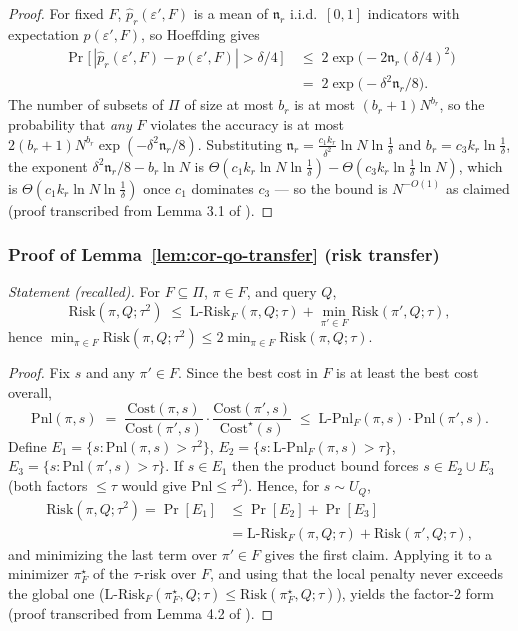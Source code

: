 \begin{proof}
For fixed $F$, $\hat{p}_r(\varepsilon',F)$ is a mean of
$\mathfrak{n}_r$ i.i.d.\ $[0,1]$ indicators with expectation
$p(\varepsilon',F)$, so Hoeffding gives
\begin{align*}
\Pr\bigl[\,|\hat{p}_r(\varepsilon',F) - p(\varepsilon',F)| >
\delta/4\,\bigr] &\;\le\; 2\exp\bigl(-2\mathfrak{n}_r(\delta/4)^2\bigr)\\
&\;=\; 2\exp\bigl(-\delta^2\mathfrak{n}_r/8\bigr).
\end{align*}
The number of subsets of $\Pi$ of size at most $b_r$ is at most
$(b_r+1)N^{b_r}$, so the probability that \emph{any} $F$ violates the
accuracy is at most $2(b_r+1)N^{b_r}\exp(-\delta^2\mathfrak{n}_r/8)$.
Substituting $\mathfrak{n}_r = \tfrac{c_1k_r}{\delta^2}\ln
N\ln\tfrac1\delta$ and $b_r = c_3k_r\ln\tfrac1\delta$, the exponent
$\delta^2\mathfrak{n}_r/8 - b_r\ln N$ is $\Theta(c_1 k_r \ln N
\ln\tfrac1\delta) - \Theta(c_3 k_r \ln\tfrac1\delta\ln N)$, which is
$\Theta(c_1 k_r \ln N \ln\tfrac1\delta)$ once $c_1$ dominates $c_3$
--- so the bound is $N^{-O(1)}$ as claimed (proof transcribed from
Lemma 3.1 of \citep{sigmod26-053}).
\end{proof}

\subsubsection*{Proof of Lemma~\ref{lem:cor-qo-transfer} (risk transfer)}
{\itshape Statement (recalled).} For $F \subseteq \Pi$, $\pi \in F$, and query $Q$,
\[
\mathrm{Risk}(\pi,Q;\tau^2) \;\le\; \mathrm{L\text{-}Risk}_F(\pi,Q;\tau) +
\min_{\pi'\in F}\mathrm{Risk}(\pi',Q;\tau),
\]
hence $\min_{\pi\in F}\mathrm{Risk}(\pi,Q;\tau^2) \le
2\min_{\pi\in F}\mathrm{Risk}(\pi,Q;\tau)$.\eop

\begin{proof}
Fix $s$ and any $\pi' \in F$. Since the best cost in $F$ is at least
the best cost overall,
\[
\mathrm{Pnl}(\pi,s) \;=\;
\frac{\mathrm{Cost}(\pi,s)}{\mathrm{Cost}(\pi',s)}\cdot
\frac{\mathrm{Cost}(\pi',s)}{\mathrm{Cost}^{\star}(s)} \;\le\;
\mathrm{L\text{-}Pnl}_F(\pi,s)\cdot \mathrm{Pnl}(\pi',s).
\]
Define $E_1 = \{s : \mathrm{Pnl}(\pi,s) > \tau^2\}$, $E_2 = \{s :
\mathrm{L\text{-}Pnl}_F(\pi,s) > \tau\}$, $E_3 = \{s :
\mathrm{Pnl}(\pi',s) > \tau\}$. If $s \in E_1$ then the product bound
forces $s \in E_2 \cup E_3$ (both factors $\le \tau$ would give
$\mathrm{Pnl} \le \tau^2$). Hence, for $s \sim U_Q$,
\begin{align*}
\mathrm{Risk}(\pi,Q;\tau^2) = \Pr[E_1] &\le \Pr[E_2] + \Pr[E_3]\\
&= \mathrm{L\text{-}Risk}_F(\pi,Q;\tau) + \mathrm{Risk}(\pi',Q;\tau),
\end{align*}
and minimizing the last term over $\pi' \in F$ gives the first claim.
Applying it to a minimizer $\pi^{\star}_F$ of the $\tau$-risk over
$F$, and using that the local penalty never exceeds the global one
($\mathrm{L\text{-}Risk}_F(\pi^{\star}_F,Q;\tau) \le
\mathrm{Risk}(\pi^{\star}_F,Q;\tau)$), yields the factor-$2$ form
(proof transcribed from Lemma 4.2 of \citep{sigmod26-053}).
\end{proof}

